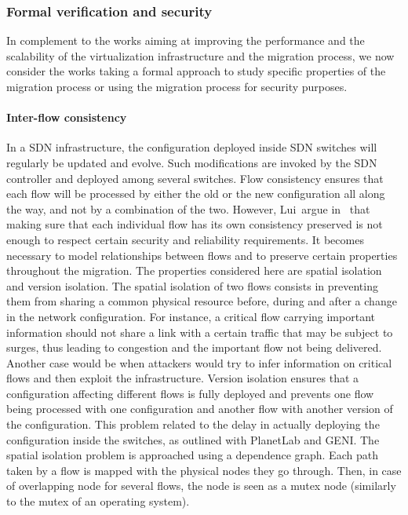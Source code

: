 \subsubsection{Formal verification and security}
In complement to the works aiming at improving the performance and the scalability of the virtualization infrastructure and the migration process, we now consider the works taking a formal approach to study specific properties of the migration process or using the migration process for security purposes.

\paragraph{Inter-flow consistency}
In a SDN infrastructure, the configuration deployed inside SDN switches will regularly be updated and evolve. Such modifications are invoked by the SDN controller and deployed among several switches.
Flow consistency ensures that each flow will be processed by either the old or the new configuration all along the way, and not by a combination of the two.
However, Lui~\etal argue in~\cite{Liu2015a} that making sure that each individual flow has its own consistency preserved is not enough to respect certain security and reliability requirements.
It becomes necessary to model relationships between flows and to preserve certain properties throughout the migration.
The properties considered here are spatial isolation and version isolation.
The spatial isolation of two flows consists in preventing them from sharing a common physical resource before, during and after a change in the network configuration.
For instance, a critical flow carrying important information should not share a link with a certain traffic that may be subject to surges, thus leading to congestion and the important flow not being delivered. Another case would be when attackers would try to infer information on critical flows and then exploit the infrastructure.
Version isolation ensures that a configuration affecting different flows is fully deployed and prevents one flow being processed with one configuration and another flow with another version of the configuration.
This problem related to the delay in actually deploying the configuration inside the switches, as outlined with PlanetLab and GENI.
The spatial isolation problem is approached using a dependence graph. Each path taken by a flow is mapped with the physical nodes they go through. Then, in case of overlapping node for several flows, the node is seen as a mutex node (similarly to the mutex of an operating system).
